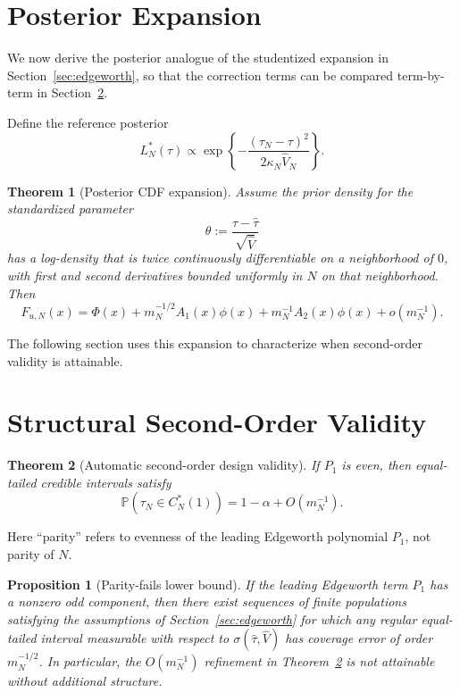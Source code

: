 \documentclass[aos]{imsart}
\newtheorem{theorem}{Theorem}
\newtheorem{proposition}{Proposition}
\theoremstyle{definition}
\theoremstyle{plain}
\newcommand{\Prb}{\mathbb{P}}
\newcommand{\PhiN}{\Phi}
\newcommand{\phiN}{\phi}
\newcommand{\mN}{m_N}
\newcommand{\tauN}{\hat{\tau}_N}
\newcommand{\VN}{\hat V_N}
\begin{document}
\section{Posterior Expansion}\label{sec:posterior}
We now derive the posterior analogue of the studentized expansion in Section~\ref{sec:edgeworth}, so that the correction terms can be compared term-by-term in Section~\ref{sec:second_order}.

Define the reference posterior
\[
L_N^*(\tau) \propto
\exp\left\{-\frac{(\tauN-\tau)^2}{2\kappa_N \VN}\right\}.
\]

\begin{theorem}[Posterior CDF expansion]\label{thm:posterior_expansion}
Assume the prior density for the standardized parameter
\[
\theta:=\frac{\tau-\hat\tau}{\sqrt{\hat V}}
\]
has a log-density that is twice continuously differentiable on a neighborhood of $0$, with first and second derivatives bounded uniformly in $N$ on that neighborhood. Then
\[
F_{u,N}(x)
=
\PhiN(x)
+ \mN^{-1/2} A_1(x)\phiN(x)
+ \mN^{-1} A_2(x)\phiN(x)
+ o(\mN^{-1}).
\]
\end{theorem}
The following section uses this expansion to characterize when second-order validity is attainable.

\section{Structural Second-Order Validity}\label{sec:second_order}

\begin{theorem}[Automatic second-order design validity]\label{thm:second_order_validity}
If $P_1$ is even, then equal-tailed credible intervals satisfy
\[
\Prb(\tau_N \in C_N^*(1))
=
1-\alpha + O(\mN^{-1}).
\]
\end{theorem}
Here ``parity'' refers to evenness of the leading Edgeworth polynomial $P_1$, not parity of $N$.

\begin{proposition}[Parity-fails lower bound]\label{prop:parity_fail}
If the leading Edgeworth term $P_1$ has a nonzero odd component, then there exist sequences of finite populations
satisfying the assumptions of Section~\ref{sec:edgeworth} for which any regular equal-tailed interval measurable
with respect to $\sigma(\hat\tau,\hat V)$ has coverage error of order $\mN^{-1/2}$. In particular, the $O(\mN^{-1})$
refinement in Theorem~\ref{thm:second_order_validity} is not attainable without additional structure.
\end{proposition}
\end{document}

